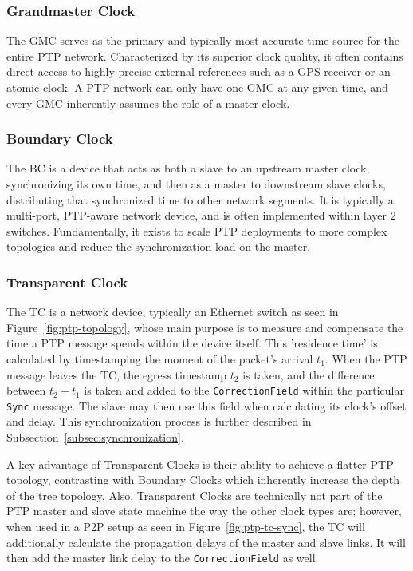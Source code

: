 \subsubsection{Grandmaster Clock}
\label{subsubsec:grandmaster-clock}
The \ac{GMC} serves as the primary and typically most accurate time source for the entire \ac{PTP} network. Characterized by its superior clock quality, it often contains direct access to highly precise external references such as a \ac{GPS} receiver or an atomic clock. A \ac{PTP} network can only have one \ac{GMC} at any given time, and every \ac{GMC} inherently assumes the role of a master clock.

\subsubsection{Boundary Clock}
\label{subsubsec:boundary-clock}
The \ac{BC} is a device that acts as both a slave to an upstream master clock, synchronizing its own time, and then as a master to downstream slave clocks, distributing that synchronized time to other network segments. It is typically a multi-port, \ac{PTP}-aware network device, and is often implemented within layer 2 switches. Fundamentally, it exists to scale \ac{PTP} deployments to more complex topologies and reduce the synchronization load on the master.

\subsubsection{Transparent Clock}
\label{subsubsec:transparent-clock}
The \ac{TC} is a network device, typically an Ethernet switch as seen in Figure~\ref{fig:ptp-topology}, whose main purpose is to measure and compensate the time a \ac{PTP} message spends within the device itself. This 'residence time' is calculated by timestamping the moment of the packet's arrival $t_1$. When the \ac{PTP} message leaves the \ac{TC}, the egress timestamp $t_2$ is taken, and the difference between $t_2-t_1$ is taken and added to the \texttt{CorrectionField} within the particular \texttt{Sync} message. The slave may then use this field when calculating its clock's offset and delay. This synchronization process is further described in Subsection~\ref{subsec:synchronization}.

A key advantage of Transparent Clocks is their ability to achieve a flatter \ac{PTP} topology, contrasting with Boundary Clocks which inherently increase the depth of the tree topology. Also, Transparent Clocks are technically not part of the \ac{PTP} master and slave state machine the way the other clock types are; however, when used in a \ac{P2P} setup as seen in Figure~\ref{fig:ptp-tc-sync}, the \ac{TC} will additionally calculate the propagation delays of the master and slave links. It will then add the master link delay to the \texttt{CorrectionField} as well.

